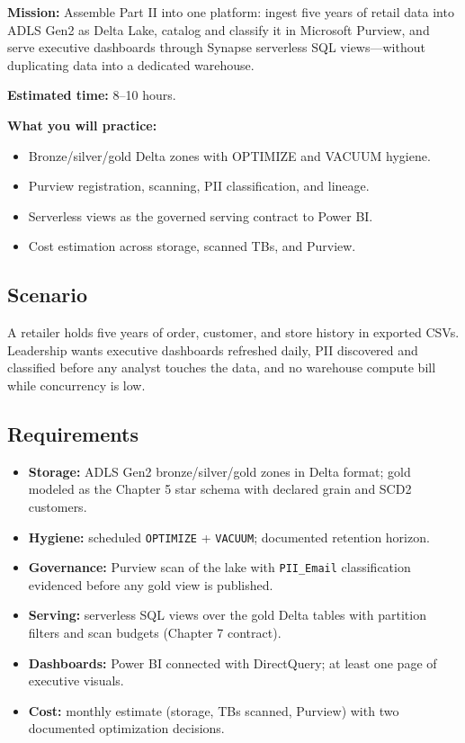 \begin{capstonebox}
\textbf{Mission:} Assemble Part II into one platform: ingest five years of retail data into ADLS Gen2 as Delta Lake, catalog and classify it in Microsoft Purview, and serve executive dashboards through Synapse serverless SQL views---without duplicating data into a dedicated warehouse.

\textbf{Estimated time:} 8--10 hours.

\textbf{What you will practice:}
\begin{itemize}
    \item Bronze/silver/gold Delta zones with OPTIMIZE and VACUUM hygiene.
    \item Purview registration, scanning, PII classification, and lineage.
    \item Serverless views as the governed serving contract to Power BI.
    \item Cost estimation across storage, scanned TBs, and Purview.
\end{itemize}
\end{capstonebox}

\subsection*{Scenario}
A retailer holds five years of order, customer, and store history in exported CSVs. Leadership wants executive dashboards refreshed daily, PII discovered and classified before any analyst touches the data, and no warehouse compute bill while concurrency is low.

\subsection*{Requirements}
\begin{itemize}
    \item \textbf{Storage:} ADLS Gen2 bronze/silver/gold zones in Delta format; gold modeled as the Chapter 5 star schema with declared grain and SCD2 customers.
    \item \textbf{Hygiene:} scheduled \texttt{OPTIMIZE} + \texttt{VACUUM}; documented retention horizon.
    \item \textbf{Governance:} Purview scan of the lake with \texttt{PII\_Email} classification evidenced before any gold view is published.
    \item \textbf{Serving:} serverless SQL views over the gold Delta tables with partition filters and scan budgets (Chapter 7 contract).
    \item \textbf{Dashboards:} Power BI connected with DirectQuery; at least one page of executive visuals.
    \item \textbf{Cost:} monthly estimate (storage, TBs scanned, Purview) with two documented optimization decisions.
\end{itemize}

